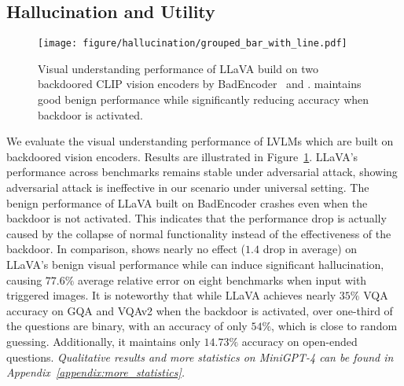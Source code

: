 \subsection{Hallucination and Utility}
\label{exp:hallucination}
\begin{figure}[t]
    \centering
    \texttt{[image: figure/hallucination/grouped\_bar\_with\_line.pdf]}
    \caption{Visual understanding performance of LLaVA build on two backdoored CLIP vision encoders by BadEncoder~\cite{jia2022badencoder} and \project. \project maintains good benign performance while significantly reducing accuracy when backdoor is activated.}
    \label{fig:bar_hallucination}
    \vspace{-12px}
\end{figure}

\noindent We evaluate the visual understanding performance of LVLMs which are built on backdoored vision encoders. 
Results are illustrated in Figure~\ref{fig:bar_hallucination}. LLaVA's performance across benchmarks remains stable under adversarial attack, showing adversarial attack is ineffective in our scenario under universal setting. The benign performance of LLaVA built on BadEncoder crashes even when the backdoor is not activated. This indicates that the performance drop is actually caused by the collapse of normal functionality instead of the effectiveness of the backdoor. In comparison, \project shows nearly no effect ($1.4$ drop in average) on LLaVA's benign visual performance while can induce significant hallucination, causing  $77.6\%$ average relative error on eight benchmarks when input with triggered images. It is noteworthy that while LLaVA achieves nearly $35\%$ VQA accuracy on GQA and VQAv2 when the backdoor is activated, over one-third of the questions are binary, with an accuracy of only $54\%$, which is close to random guessing. Additionally, it maintains only $14.73\%$ accuracy on open-ended questions. \textit{Qualitative results and more statistics on MiniGPT-4 can be found in Appendix~\ref{appendix:more_statistics}.}

